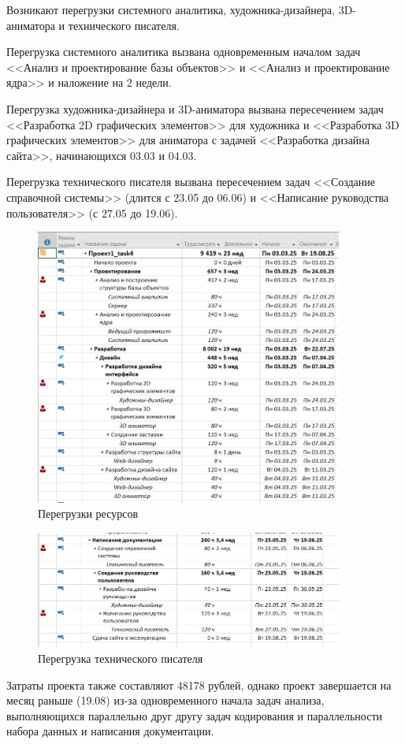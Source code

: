 Возникают перегрузки системного аналитика, художника-дизайнера, 3D-аниматора и технического писателя.

Перегрузка системного аналитика вызвана одновременным началом задач <<Анализ и проектирование базы объектов>> и <<Анализ и проектирование ядра>> и наложение на 2 недели.

Перегрузка художника-дизайнера и 3D-аниматора вызвана пересечением задач <<Разработка 2D графических элементов>> для художника и <<Разработка 3D графических элементов>> для аниматора с задачей <<Разработка дизайна сайта>>, начинающихся 03.03 и 04.03.

Перегрузка технического писателя вызвана пересечением задач <<Создание справочной системы>> (длится с 23.05 до 06.06) и <<Написание руководства пользователя>> (с 27.05 до 19.06).

\begin{figure}[H]
	\centering
	\includegraphics[width=0.9\textwidth]{img/lab5/screen5_4.jpg}
	\caption{Перегрузки ресурсов}
	\label{fig:5_screen12}
\end{figure}

\begin{figure}[H]
	\centering
	\includegraphics[width=0.9\textwidth]{img/lab5/screen5_5.jpg}
	\caption{Перегрузка технического писателя}
	\label{fig:5_screen13}
\end{figure}

Затраты проекта также составляют 48178 рублей, однако проект завершается на месяц раньше (19.08) из-за одновременного начала задач анализа, выполняющихся параллельно друг другу задач кодирования и параллельности набора данных и написания документации.

